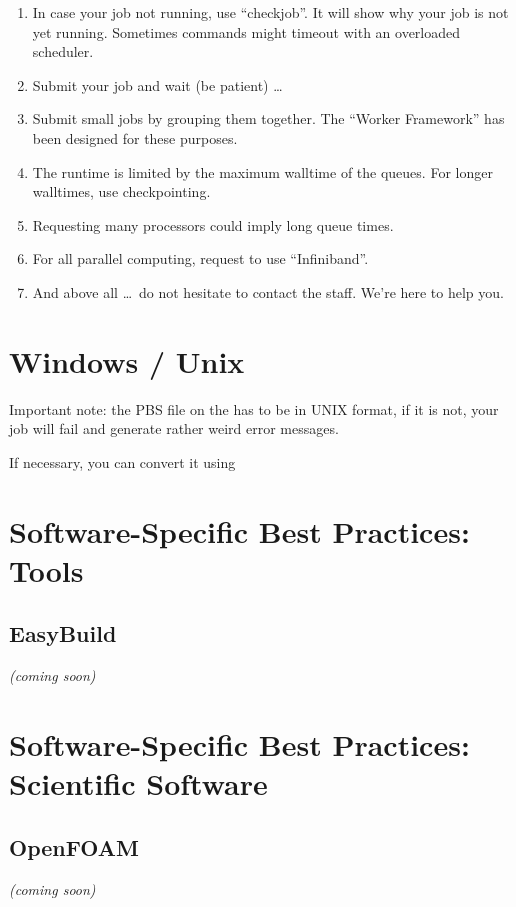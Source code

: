 \begin{enumerate}
  \item  In case your job not running, use ``checkjob''.  It will show why your
    job is not yet running. Sometimes commands might timeout with an overloaded
    scheduler.

  \item  Submit your job and wait (be patient) \ldots

  \item  Submit small jobs by grouping them together. The ``Worker Framework''
    has been designed for these purposes.

  \item  The runtime is limited by the maximum walltime of the queues. For
    longer walltimes, use checkpointing.

  \item  Requesting many processors could imply long queue times.

  \item  For all parallel computing, request to use ``Infiniband''.

  \item  And above all \dots\ do not hesitate to contact the \hpc staff. We're
    here to help you.
\end{enumerate}

\section{Windows / Unix}

Important note: the PBS file on the \hpc has to be in UNIX format, if it is
not, your job will fail and generate rather weird error messages.

If necessary, you can convert it using
\begin{prompt}
\end{prompt}


\section{Software-Specific Best Practices: Tools}
\label{sec:software-specific-best-practices-tools}

\subsection{EasyBuild}
\label{sec:best-practices-easybuild}

\textit{(coming soon)}

\section{Software-Specific Best Practices: Scientific Software}
\label{sec:software-specific-best-practices-scientific-software}

\subsection{OpenFOAM}
\label{sec:best-practices-openfoam}

\textit{(coming soon)}
